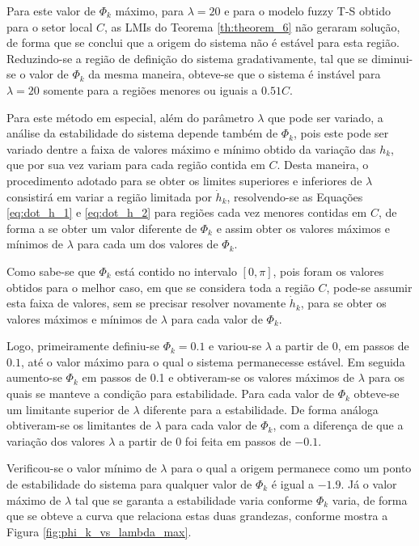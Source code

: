 Para este valor de $\Phi_k$ máximo, para $\lambda = 20$ e para o modelo fuzzy T-S obtido para o setor local $C$, as LMIs do Teorema \ref{th:theorem_6} não geraram solução, de forma que se conclui que a origem do sistema não é estável para esta região. Reduzindo-se a região de definição do sistema gradativamente, tal que se diminui-se o valor de $\Phi_k$ da mesma maneira, obteve-se que o sistema é instável para $\lambda = 20$ somente para a regiões menores ou iguais a $0.51C$.

Para este método em especial, além do parâmetro $\lambda$ que pode ser variado, a análise da estabilidade do sistema depende também de $\Phi_k$, pois este pode ser variado dentre a faixa de valores máximo e mínimo obtido da variação das $h_k$, que por sua vez variam para cada região contida em $C$. Desta maneira, o procedimento adotado para se obter os limites superiores e inferiores de $\lambda$ consistirá em variar a região limitada por $\dot{h}_k$, resolvendo-se as Equações \ref{eq:dot_h_1} e \ref{eq:dot_h_2} para regiões cada vez menores contidas em $C$, de forma a se obter um valor diferente de $\Phi_k$ e assim obter os valores máximos e mínimos de $\lambda$ para cada um dos valores de $\Phi_k$.

Como sabe-se que $\Phi_k$ está contido no intervalo $[0, \pi]$, pois foram os valores obtidos para o melhor caso, em que se considera toda a região $C$, pode-se assumir esta faixa de valores, sem se precisar resolver novamente $\dot{h}_k$, para se obter os valores máximos e mínimos de $\lambda$ para cada valor de $\Phi_k$.

Logo, primeiramente definiu-se $\Phi_k = 0.1$ e variou-se $\lambda$ a partir de $0$, em passos de $0.1$, até o valor máximo para o qual o sistema permanecesse estável. Em seguida aumento-se $\Phi_k$ em passos de 0.1 e obtiveram-se os valores máximos de $\lambda$ para os quais se manteve a condição para estabilidade. Para cada valor de $\Phi_k$ obteve-se um limitante superior de $\lambda$ diferente para a estabilidade. De forma análoga obtiveram-se os limitantes de $\lambda$ para cada valor de $\Phi_k$, com a diferença de que a variação dos valores $\lambda$ a partir de $0$ foi feita em passos de $-0.1$.

Verificou-se o valor mínimo de $\lambda$ para o qual a origem permanece como um ponto de estabilidade do sistema para qualquer valor de $\Phi_k$ é igual a $-1.9$. Já o valor máximo de $\lambda$ tal que se garanta a estabilidade varia conforme $\Phi_k$ varia, de forma que se obteve a curva que relaciona estas duas grandezas, conforme mostra a Figura \ref{fig:phi_k_vs_lambda_max}.

